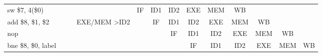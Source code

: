 \documentclass[pdftex,12pt,a4paper]{report}
\begin{document}
\begin{table}[!htb]
{\begin{tabular}{llllllllccclllllll}
sw \$7, 4(\$0)                      &                         &                          &                          &                          &                          &                                                  &                                                  & \multicolumn{1}{l|}{}                            & \multicolumn{1}{c|}{IF}                          & \multicolumn{1}{c|}{ID1} & \multicolumn{1}{c|}{ID2} & \multicolumn{1}{c|}{EXE}                         & \multicolumn{1}{c|}{\cellcolor[HTML]{FFCC67}MEM} & \multicolumn{1}{c|}{WB}                          & \multicolumn{1}{c}{}     & \multicolumn{1}{c}{}     & \multicolumn{1}{c}{}    \\ \cline{10-16}
add \$8, \$1, \$2                   &                         &                          & \multicolumn{6}{r}{EXE/MEM \textgreater ID2}                                                                                                                                                                                            & \multicolumn{1}{c|}{}                            & \multicolumn{1}{c|}{IF}  & \multicolumn{1}{c|}{ID1} & \multicolumn{1}{c|}{ID2}                         & \multicolumn{1}{c|}{\cellcolor[HTML]{F8A102}EXE} & \multicolumn{1}{c|}{\cellcolor[HTML]{FFCC67}MEM} & \multicolumn{1}{c|}{WB}  & \multicolumn{1}{c}{}     & \multicolumn{1}{c}{}    \\ \cline{11-17}
nop                               &                         &                          &                          &                          &                          &                                                  &                                                  & \multicolumn{1}{l}{}                             &                                                  & \multicolumn{1}{c|}{}    & \multicolumn{1}{c|}{IF}  & \multicolumn{1}{c|}{ID1}                         & \multicolumn{1}{c|}{ID2}                         & \multicolumn{1}{c|}{EXE}                         & \multicolumn{1}{c|}{MEM} & \multicolumn{1}{c|}{WB}  & \multicolumn{1}{c}{}    \\ \cline{12-18} 
bne \$8, \$0, label                 &                         &                          &                          &                          &                          &                                                  &                                                  & \multicolumn{1}{l}{}                             &                                                  &                          & \multicolumn{1}{c|}{}    & \multicolumn{1}{c|}{IF}                          & \multicolumn{1}{c|}{ID1}                         & \multicolumn{1}{c|}{\cellcolor[HTML]{FFCC67}ID2} & \multicolumn{1}{c|}{EXE} & \multicolumn{1}{c|}{MEM} & \multicolumn{1}{c|}{WB} \\ \cline{13-18} 
\end{tabular}}
\end{table}
\end{document}
